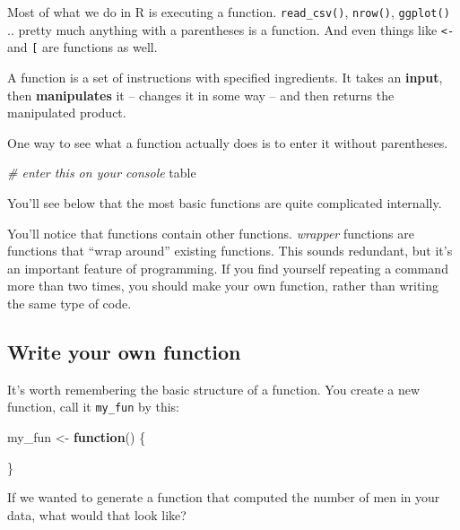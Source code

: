 \documentclass[]{book}
\newenvironment{Shaded}{\begin{snugshade}}{\end{snugshade}}
\newcommand{\KeywordTok}[1]{\textcolor[rgb]{0.13,0.29,0.53}{\textbf{#1}}}
\newcommand{\StringTok}[1]{\textcolor[rgb]{0.31,0.60,0.02}{#1}}
\newcommand{\CommentTok}[1]{\textcolor[rgb]{0.56,0.35,0.01}{\textit{#1}}}
\newcommand{\ControlFlowTok}[1]{\textcolor[rgb]{0.13,0.29,0.53}{\textbf{#1}}}
\newcommand{\OperatorTok}[1]{\textcolor[rgb]{0.81,0.36,0.00}{\textbf{#1}}}
\newcommand{\NormalTok}[1]{#1}
\theoremstyle{definition}
\theoremstyle{definition}
\theoremstyle{definition}
\theoremstyle{remark}
\begin{document}
Most of what we do in R is executing a function. \texttt{read\_csv()},
\texttt{nrow()}, \texttt{ggplot()} .. pretty much anything with a
parentheses is a function. And even things like \texttt{\textless{}-}
and \texttt{{[}} are functions as well.

A function is a set of instructions with specified ingredients. It takes
an \textbf{input}, then \textbf{manipulates} it -- changes it in some
way -- and then returns the manipulated product.

One way to see what a function actually does is to enter it without
parentheses.

\begin{Shaded}
\begin{Highlighting}[]
\CommentTok{# enter this on your console}
\NormalTok{table}
\end{Highlighting}
\end{Shaded}

You'll see below that the most basic functions are quite complicated
internally.

You'll notice that functions contain other functions. \emph{wrapper}
functions are functions that ``wrap around'' existing functions. This
sounds redundant, but it's an important feature of programming. If you
find yourself repeating a command more than two times, you should make
your own function, rather than writing the same type of code.

\subsection{Write your own function}\label{write-your-own-function}

It's worth remembering the basic structure of a function. You create a
new function, call it \texttt{my\_fun} by this:

\begin{Shaded}
\begin{Highlighting}[]
\NormalTok{my_fun <-}\StringTok{ }\ControlFlowTok{function}\NormalTok{() \{}
  
\NormalTok{\}}
\end{Highlighting}
\end{Shaded}

If we wanted to generate a function that computed the number of men in
your data, what would that look like?

\begin{Shaded}
\end{Shaded}
\end{document}
